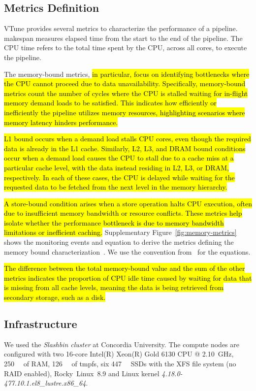 \documentclass[conference]{IEEEtran}
\newcommand{\HL}[1]{\hl{#1}}
\begin{document}
\subsection{Metrics Definition}
VTune provides several metrics to characterize the performance of a pipeline. makespan measures elapsed time from the start to the end of the pipeline. The CPU time refers to the total time spent by the CPU, across all cores, to execute the pipeline. 

The memory-bound metrics, \HL{in particular, focus on identifying bottlenecks where the CPU cannot proceed due to data unavailability. Specifically, memory-bound metrics count the number of cycles where the CPU is stalled waiting for in-flight memory demand loads to be satisfied. This indicates how efficiently or inefficiently the pipeline utilizes memory resources, highlighting scenarios where memory latency hinders performance.}

\HL{L1 bound occurs when a demand load stalls CPU cores, even though the required data is already in the L1 cache. Similarly, L2, L3, and DRAM bound conditions occur when a demand load causes the CPU to stall due to a cache miss at a particular cache level, with the data instead residing in L2, L3, or DRAM, respectively. In each of these cases, the CPU is delayed while waiting for the requested data to be fetched from the next level in the memory hierarchy.}

\HL{A store-bound condition arises when a store operation halts CPU execution, often due to insufficient memory bandwidth or resource conflicts. These metrics help isolate whether the performance bottleneck is due to memory bandwidth limitations or inefficient caching.} Supplementary Figure~\ref{fig:memory-metrics} shows the monitoring events and equation to derive the metrics defining the memory bound characterization~\cite{Intel2006-lc}. We use the convention from~\cite{Kukunas2015-jd} for the equations. 

\HL{The difference between the total memory-bound value and the sum of the other metrics indicates the proportion of CPU idle time caused by waiting for data that is missing from all cache levels, meaning the data is being retrieved from secondary storage, such as a disk.}
			
\subsection{Infrastructure}
We used the \textit{Slashbin cluster} at Concordia University. The compute nodes are configured with two 16-core Intel(R) Xeon(R) Gold 6130 CPU @ \SI{2.10}{\giga\hertz}, \SI{250}{\gibi\byte} of RAM, \SI{126}{\gibi\byte} of tmpfs, six \SI{447}{\gibi\byte} SSDs with the XFS file system (no RAID enabled), Rocky~Linux~8.9 and Linux kernel \textit{4.18.0-477.10.1.el8\_lustre.x86\_64}.
			
\end{document}
